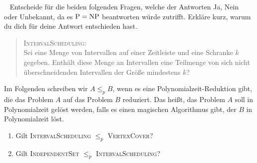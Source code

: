 \documentclass{uebung_cs}
\begin{document}
\begin{aufgabe}[NP]\
	Entscheide für die beiden folgenden Fragen, welche der Antworten \glqq Ja\grqq{}, \glqq Nein\grqq{} oder \glqq Unbekannt, da es $\mathrm{P} = \mathrm{NP}$ beantworten würde\grqq{} zutrifft. Erkläre kurz, warum du dich für deine Antwort entschieden hast.

	\begin{quote}
		\textsc{IntervalScheduling}: \\
		Sei eine Menge von Intervallen auf einer Zeitleiste und eine Schranke $k$ gegeben. Enthält diese Menge an Intervallen eine Teilmenge von sich nicht überschneidenden Intervallen der Größe mindestens $k$?
	\end{quote}
	
	Im Folgenden schreiben wir $A \leq_p B$, wenn es eine Polynomialzeit-Reduktion gibt, die das Problem $A$ auf das Problem $B$ reduziert. Das heißt, das Problem $A$ soll in Polynomialzeit gelöst werden, falls es einen magischen Algorithmus gibt, der $B$ in Polynomialzeit löst.
	\begin{enumerate}
		\item Gilt \textsc{IntervalScheduling} $\leq_p$ \textsc{VertexCover}?
		\item Gilt \textsc{IndependentSet} $\leq_p$ \textsc{IntervalScheduling}?
	\end{enumerate}
\end{aufgabe}
\end{document}
